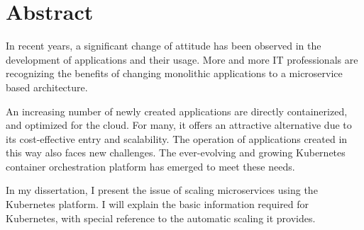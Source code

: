  




\vfill
\selectenglish

\chapter*{Abstract}

In recent years, a significant change of attitude has been observed in the development of applications and their usage. More and more IT professionals are recognizing the benefits of changing monolithic applications to a microservice based architecture.

An increasing number of newly created applications are directly containerized, and optimized for the cloud.
For many, it offers an attractive alternative due to its cost-effective entry and scalability.
The operation of applications created in this way also faces new challenges.
The ever-evolving and growing Kubernetes container orchestration platform has emerged to meet these needs.

In my dissertation, I present the issue of scaling microservices using the Kubernetes platform. 
I will explain the basic information required for Kubernetes, with special reference to the automatic scaling it provides.


